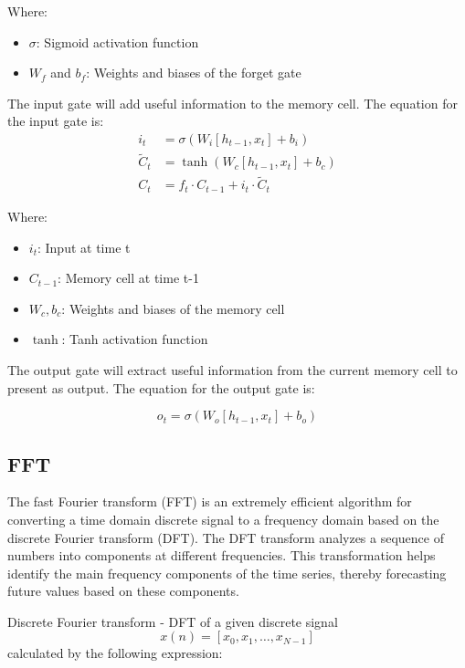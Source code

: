 \documentclass{ieeeojies}
\begin{document}
Where:
\begin{itemize}
    \item $\sigma$: Sigmoid activation function
    \item $W_f$ and $b_f$: Weights and biases of the forget gate
\end{itemize}

The input gate will add useful information to the memory cell. The equation for the input gate is:
\\
\begin{align*}
    i_t &= \sigma(W_i [h_{t-1}, x_t] + b_i) \\
    \tilde{C}_t &= \tanh(W_c [h_{t-1}, x_t] + b_c) \\
    C_t &= f_t \cdot C_{t-1} + i_t \cdot \tilde{C}_t
\end{align*}

Where:
\begin{itemize}
    \item $i_t$: Input at time t
    \item $C_{t-1}$: Memory cell at time t-1
    \item $W_c, b_c$: Weights and biases of the memory cell
    \item $\tanh$: Tanh activation function
\end{itemize}

The output gate will extract useful information from the current memory cell to present as output. The equation for the output gate is:

\begin{equation*}
    o_t = \sigma(W_o [h_{t-1}, x_t] + b_o)
\end{equation*}
    

\subsection{FFT}

The fast Fourier transform (FFT) is an extremely efficient algorithm for converting a time domain discrete signal to a frequency domain based on the discrete Fourier transform (DFT). The DFT transform analyzes a sequence of numbers into components at different frequencies. This transformation helps identify the main frequency components of the time series, thereby forecasting future values based on these components.

Discrete Fourier transform - DFT of a given discrete signal 
\[
x(n) = [x_0, x_1, \ldots, x_{N-1}]
\] 
calculated by the following expression:
\end{document}
